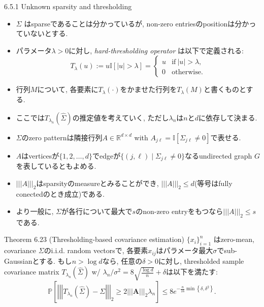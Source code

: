 \documentclass[unicode,aspectratio=169,11pt]{beamer}
\newcommand{\bb}{\mathbb}
\begin{document}
\begin{frame}{6.5.1 Unknown sparsity and thresholding}{}
  \begin{itemize}
    \item $\Sigma$ はsparseであることは分かっているが, non-zero entriesのpositionは分かっていないとする.
    \item パラメータ$\lambda > 0$に対し, {\it hard-thresholding operator} は以下で定義される:
          \[
            T_\lambda(u) := u \bb{I}[|u| > \lambda]
            = \begin{cases}
                u & \mathrm{if}\ |u| > \lambda,\\
                0 & \mathrm{otherwise}.
              \end{cases}
              \tag{6.52}
          \]
    \item 行列$M$について, 各要素に$T_\lambda(\cdot)$をかませた行列を$T_\lambda(M)$と書くものとする.
    \item ここでは$T_{\lambda_n}(\widehat{\Sigma})$の推定値を考えていく, ただし$\lambda_n$は$n$と$d$に依存して決まる.
  \end{itemize}
\end{frame}

\begin{frame}{}{}
  \begin{itemize}
    \item $\Sigma$のzero patternは隣接行列$A \in \bb{R}^{d\times d}$ with $A_{j\ell} = \bb{I}[\Sigma_{j\ell} \ne 0]$で表せる.
    \item $A$はverticesが$\{1,2,\dots,d\}$でedgeが$\{(j, \ell)\mid \Sigma_{j\ell} \ne 0\}$なるundirected graph $G$ を表しているともよめる.
    \item $|||A|||_2$はsparsityのmeasureとみることができ, $|||A|||_2 \le d$(等号はfully conectedのとき成立)である.
    \item より一般に, $\Sigma$が各行について最大で$s$のnon-zero entryをもつなら$|||A|||_2 \le s$である.
  \end{itemize}
\end{frame}

\begin{frame}{}{}
  \begin{block}{Theorem 6.23 (Thresholding-based covariance estimation)}
    $\{x_i\}_{i=1}^n$ はzero-mean, covariance $\Sigma$のi.i.d. random vectorsで,
    各要素$x_{ij}$はパラメータ最大$\sigma$でsub-Gaussianとする.
    もし$n > \log d$なら, 任意の$\delta > 0$に対し, 
    thresholded sample covariance matrix $T_{\lambda_n}(\widehat{\Sigma})$ w/ $\lambda_n/\sigma^2 = 8 \sqrt{\frac{\log d}{n}} + \delta$は以下を満たす:
    \[
      \mathbb{P}\left[\left|\left|\left|T_{\lambda_{n}}(\widehat{\Sigma})- \Sigma\right|\right|\right|_{2} \geq 2|||\mathbf{A}|||_{2} \lambda_{n}\right]
      \leq 8 e^{-\frac{n}{16} \min \left\{\delta, \delta^{2}\right\}}.
      \tag{6.53}
    \]
  \end{block}
\end{frame}
\end{document}
